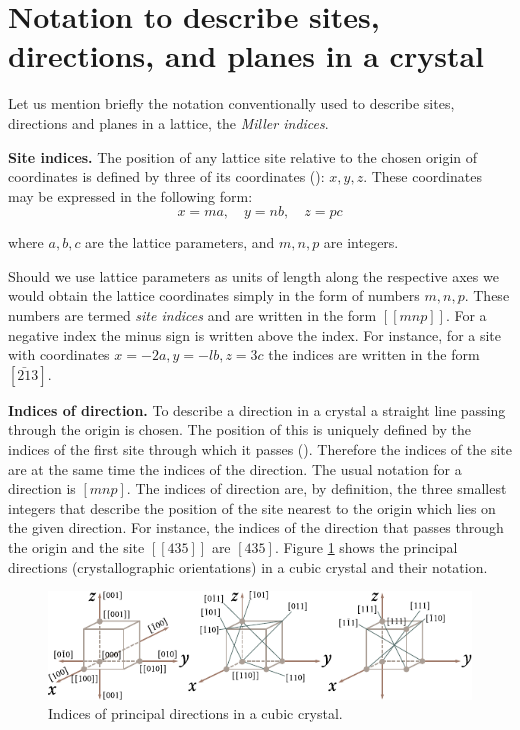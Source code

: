 \section{Notation to describe sites, directions, and planes in a crystal}\label{sec:9}

Let us mention briefly the notation conventionally used to describe sites, directions and planes in a lattice, the \textit{Miller indices}.

\textbf{Site indices.} The position of any lattice site relative to the chosen origin of coordinates is defined by three of its coordinates (): $x, y, z$. These coordinates may be expressed in the following form:
\begin{equation*}
	x = ma,\quad y = nb,\quad z = pc
\end{equation*}

\noindent
where $a, b, c$ are the lattice parameters, and $m, n, p$ are integers.

Should we use lattice parameters as units of length along the respective axes we would obtain the lattice coordinates simply in the form of numbers $m, n, p$. These numbers are termed \textit{site indices} and are written in the form $[[mnp]]$. For a negative index the minus sign is written above the index. For instance, for a site with coordinates $x=-2a, y =-lb, z=3c$ the indices are written in the form $[\bar{21}3]$.

\textbf{Indices of direction.} To describe a direction in a crystal a straight line passing through the origin is chosen. The position of this is uniquely defined by the indices of the first site through which it passes (). Therefore the indices of the site are at the same time the indices of the direction. The usual notation for a direction is $[mnp]$. The indices of direction are, by definition, the three smallest integers that describe the position of the site nearest to the origin which lies on the given direction. For instance, the indices of the direction that passes through the origin and the site $[[435]]$ are $[435]$. Figure \ref{fig:1_16} shows the principal directions (crystallographic orientations) in a cubic crystal and their notation.

\begin{figure}[t]
	\begin{center}
		\includegraphics[scale=1.1]{figures/ch_01/fig_1_16.pdf}
		\caption[]{Indices of principal directions in a cubic crystal.}
		\label{fig:1_16}
	\end{center}
	\vspace{-0.7cm}
\end{figure}


